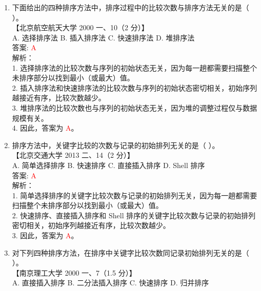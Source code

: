 \documentclass[lang=cn,newtx,10pt,scheme=chinese]{../../../elegantbook}
\begin{document}
\begin{enumerate}
    \item 下面给出的四种排序方法中，排序过程中的比较次数与排序方法无关的是（ ）。\\
    【北京航空航天大学 2000 一、10（2 分）】\\

    A. 选择排序法 \quad B. 插入排序法 \quad C. 快速排序法 \quad D. 堆排序法 \\

    答案: \textcolor{red}{A} \\

    解析：\\
    1. 选择排序法的比较次数与序列的初始状态无关，因为每一趟都需要扫描整个未排序部分以找到最小（或最大）值。\\
    2. 插入排序法和快速排序法的比较次数与序列的初始状态密切相关，初始序列越接近有序，比较次数越少。\\
    3. 堆排序法的比较次数也与序列的初始状态无关，因为堆的调整过程仅与数据规模有关。\\
    4. 因此，答案为 \textcolor{red}{A}。\\  

    \item 排序方法中，关键字比较的次数与记录的初始排列无关的是（ ）。\\
    【北京交通大学 2013 二、14（2 分）】\\

    A. 简单选择排序 \quad B. 快速排序 \quad C. 直接插入排序 \quad D. Shell 排序 \\

    答案: \textcolor{red}{A} \\

    解析：\\
    1. 简单选择排序的关键字比较次数与记录的初始排列无关，因为每一趟都需要扫描整个未排序部分以找到最小（或最大）值。\\
    2. 快速排序、直接插入排序和 Shell 排序的关键字比较次数与记录的初始排列密切相关，初始序列越接近有序，比较次数越少。\\
    3. 因此，答案为 \textcolor{red}{A}。\\  

    \item 对下列四种排序方法，在排序中关键字比较次数同记录初始排列无关的是（ ）。\\
    【南京理工大学 2000 一、7（1.5 分）】\\

    A. 直接插入排序 \quad B. 二分法插入排序 \quad C. 快速排序 \quad D. 归并排序 \\


\end{enumerate}
\end{document}

